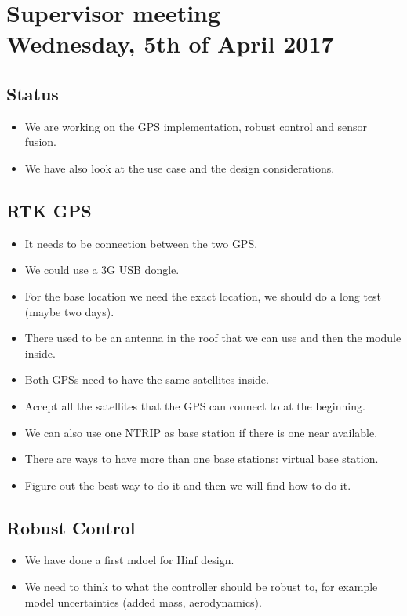 
\renewcommand{\vec}[1]{\boldsymbol{\mathbf{#1}}}


\section*{Supervisor meeting\\ \small Wednesday, 5th of April 2017}

\subsection{Status}
\begin{itemize}
    \item We are working on the GPS implementation, robust control and sensor fusion.
    \item We have also look at the use case and the design considerations.
\end{itemize}

\subsection{RTK GPS}
\begin{itemize}
    \item It needs to be connection between the two GPS.
    \item We could use a 3G USB dongle.
    \item For the base location we need the exact location, we should do a long test (maybe two days).
    \item There used to be an antenna in the roof that we can use and then the module inside.
    \item Both GPSs need to have the same satellites inside.
    \item Accept all the satellites that the GPS can connect to at the beginning.
    \item We can also use one NTRIP as base station if there is one near available.
    \item There are ways to have more than one base stations: virtual base station.
    \item Figure out the best way to do it and then we will find how to do it.
\end{itemize}

\subsection{Robust Control}
\begin{itemize}
    \item We have done a first mdoel for Hinf design.
    \item We need to think to what the controller should be robust to, for example model uncertainties (added mass, aerodynamics).
\end{itemize}

